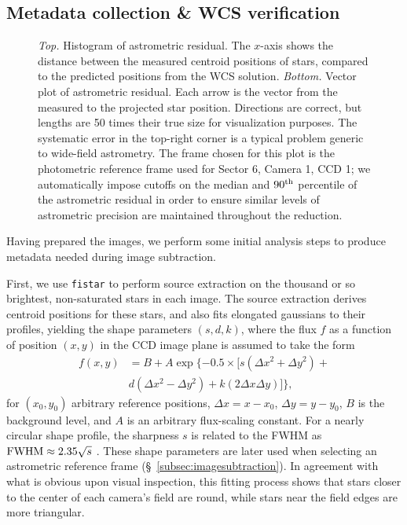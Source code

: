 \documentclass[12pt,twocolumn,tighten]{aastex62}
\begin{document}
\subsection{Metadata collection \& WCS verification}
\label{subsec:metadatacollection}

\begin{figure}[!t]
	\vspace{-0.8cm}
	\vspace{-0.8cm}
    \caption{
		{\it Top.} Histogram of astrometric residual. The $x$-axis shows 
		the distance between the measured centroid positions of stars, 
		compared to the predicted positions from the WCS solution.
		{\it Bottom.} Vector plot of astrometric residual. Each arrow is 
		the vector from the measured to the projected star position. 
		Directions are correct, but lengths are 50 times their true size for 
		visualization purposes.
    The systematic error in the top-right corner is a typical
    problem generic to wide-field astrometry.
    The frame chosen for this plot is the photometric reference frame used 
    for Sector 6, Camera 1, CCD 1; we automatically 
    impose cutoffs on the median and $90^{\rm th}$ percentile of the 
    astrometric residual in order to ensure similar levels of astrometric 
    precision are maintained throughout the reduction.
	}
	\label{fig:astromresid}
\end{figure}

Having prepared the images, we perform some initial analysis steps to
produce metadata needed during image subtraction.  

First, we use \texttt{fistar} to perform source extraction on the
thousand or so brightest, non-saturated stars in each image.  The
source extraction derives centroid positions for these stars, and also
fits elongated gaussians to their profiles, yielding the shape
parameters $(s,d,k)$, where the flux $f$ as a function of position
$(x,y)$ in the CCD image plane is assumed to take the form
\begin{align}
  f(x,y) &= B + A \exp \{ -0.5 \times [
    s(\Delta x^2 + \Delta y^2) + \\
    \nonumber
    &d(\Delta x^2 - \Delta y^2) +
    k(2\Delta x \Delta y)
  ]  \},
\end{align}
for $(x_0,y_0)$ arbitrary reference positions,
$\Delta x = x-x_0$, $\Delta y = y - y_0$, $B$ is the background
level, and $A$ is an arbitrary
flux-scaling constant.
For a nearly circular shape profile, the sharpness $s$ is related to
the FWHM as ${\rm FWHM} \approx 2.35\sqrt{s}$ \citep[{\it
e.g.},][]{Pal_2009}.  These shape parameters are later used when
selecting an astrometric reference frame
(\S~\ref{subsec:imagesubtraction}).  
In agreement with what is obvious upon visual inspection, this 
fitting process shows that stars closer to the
center of each camera's field are round, while
stars near the field edges are more triangular.
\end{document}
